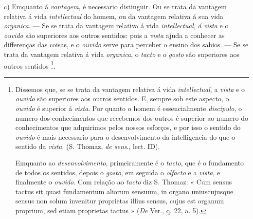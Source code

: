 c) Emquanto á \emph{vantagem}, é necessario distinguir. Ou se trata da vantagem relativa á vida \emph{intellectual} do homem, ou da vantagem relativa á sua vida \emph{organica}. --- Se se trata da vantagem relativa á vida \emph{intellectual}, \emph{á vista} e o \emph{ouvido} são superiores aos outros sentidos: pois a \emph{vista} ajuda a conhecer as differenças das coisas, e o \emph{ouvido} serve para perceber o   ensino dos sabios. --- Se se trata da vantagem relativa á vida \emph{organica}, o \emph{tacto} e o \emph{gosto} são superiores aos outros sentidos \footnote{Dissemos que, se se trata da vantagem relativa á vida \emph{intellectual}, a \emph{vista} e o \emph{ouvido} são superiores aos outros sentidos. E, sempre sob este aspecto, o \emph{ouvido} é superior á \emph{vista}. Por quanto o homem é essencialmente \emph{discipulo}, o numero dos conhecimentos que recebemos dos outros é superior ao numero do conhecimentos que adquirimos pelos nossos esforços, e por isso o sentido do \emph{ouvido} é mais necessario para o desenvolvimento da intelligencia do que o sentido da \emph{vista}. (S. Thomaz, \emph{de sens}., lect. ID).\par Emquanto ao \emph{desenvolvimento}, primeiramente é o \emph{tacto}, que é o fundamento de todos os sentidos, depois o \emph{gosto}, em seguida o \emph{olfacto} e a \emph{vista}, e finalmente o \emph{ouvido}. Com relação ao \emph{tacto} diz S. Thomaz: « Cum sensus tactus sit quasi fundamentum aliorum sensuum, in organo uniuscujusque sensus non solum invenitur proprietas illius sensus, cujus est organum proprium, sed etiam proprietas tactus » (\emph{De} Ver., q. 22, a. 5).}. \textbar{}
